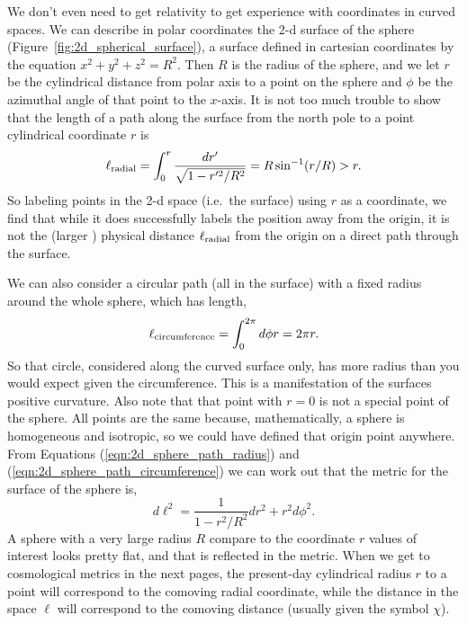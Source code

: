 We don't even need to get relativity to get experience with coordinates in curved spaces.  We can describe in polar coordinates the 2-d surface of the sphere (Figure~\ref{fig:2d_spherical_surface}), a surface defined in cartesian coordinates by the equation $x^2 + y^2 + z^2 = R^2$.  Then $R$ is the radius of the sphere, and we let $r$ be the cylindrical distance from polar axis to a point on the sphere and $\phi$ be the azimuthal angle of that point to the $x$-axis.  It is not too much trouble to show that the length of a path along the surface from the north pole to a point cylindrical coordinate $r$ is 
\begin{equation}
  \ell_{\rm radial} = \int_0^r \frac{dr'}{\sqrt{1-r'^2/R^2}} = R \sin^{-1}(r/R) > r. \label{eqn:2d_sphere_path_radius}
\end{equation}
So labeling points in the 2-d space (i.e.\ the surface) using $r$ as a coordinate, we find that while it does successfully labels the position away from the origin, it is not the (larger ) physical distance $\ell_{\rm radial}$ from the origin on a direct path through the surface.

We can also consider a circular path (all in the surface) with a fixed radius around the whole sphere, which has length,
\begin{equation}
  \ell_{\rm circumference} = \int_0^{2\pi} d\phi r = 2\pi r.  \label{eqn:2d_sphere_path_circumference}
\end{equation}
So that circle, considered along the curved surface only, has more radius than you would expect given the circumference.  This is a manifestation of the surfaces positive curvature.  Also note that that point with $r=0$ is not a special point of the sphere.  All points are the same because, mathematically, a sphere is homogeneous and isotropic, so we could have defined that origin point anywhere. From Equations (\ref{eqn:2d_sphere_path_radius}) and (\ref{eqn:2d_sphere_path_circumference}) we can work out that the metric for the surface of the sphere is,
\begin{equation}
  d\ell^2 = \frac{1}{1-r^2/R^2} dr^2 + r^2 d\phi^2.
\end{equation}
A sphere with a very large radius $R$ compare to the coordinate $r$ values of interest looks pretty flat, and that is reflected in the metric.  When we get to cosmological metrics in the next pages, the present-day cylindrical radius $r$ to a point will correspond to the comoving radial coordinate, while the distance in the space $\ell$ will correspond to the comoving distance (usually given the symbol $\chi$).


